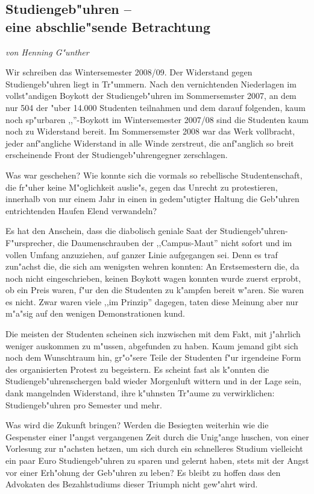\subsection[Studiengeb"uhren]{Studiengeb"uhren --\\ eine abschlie"sende
Betrachtung}
\emph{von Henning G"unther}

Wir schreiben das Wintersemester 2008/09.
Der Widerstand gegen Studiengeb"uhren liegt in Tr"ummern.
Nach den vernichtenden Niederlagen im voll\-st"an\-di\-gen Boykott der
Studiengeb"uhren im Sommersemster 2007, an dem nur 504 der "uber 14.000 Studenten teilnahmen und dem darauf folgenden, kaum noch sp"urbaren ,,\unit[5]{\EUR}{}''-Boykott im Wintersemester 2007/08 sind die Studenten kaum noch zu Widerstand bereit. Im Sommersemster 2008 war das Werk vollbracht, jeder anf"angliche Widerstand in alle Winde zerstreut, die anf"anglich so breit erscheinende Front der Studiengeb"uhrengegner zerschlagen.

Was war geschehen?
Wie konnte sich die vormals so rebellische Studentenschaft, die fr"uher keine M"oglichkeit auslie"s, gegen das Unrecht zu protestieren, innerhalb von nur einem Jahr in einen in gedem"utigter Haltung die Geb"uhren entrichtenden Haufen Elend verwandeln?

Es hat den Anschein, dass die diabolisch geniale Saat der
Studiengeb"uhren-F"ursprecher, die Daumenschrauben der ,,Campus-Maut'' nicht
sofort und im vollen Umfang anzuziehen, auf ganzer Linie aufgegangen sei. Denn es traf zun"achst die, die sich am wenigsten wehren konnten: An Erstsemestern die, da noch nicht eingeschrieben, keinen Boykott wagen
konnten wurde zuerst erprobt, ob \unit[500]{\EUR}{} ein Preis waren, f"ur den die Studenten zu k"ampfen bereit w"aren. Sie waren es nicht.
Zwar waren viele ,,im Prinzip'' dagegen, taten diese Meinung aber nur m"a"sig
auf den wenigen Demonstrationen kund.

Die meisten der Studenten scheinen sich inzwischen mit dem Fakt, mit j"ahrlich
\unit[1000]{\EUR}{} weniger auskommen zu m"ussen, abgefunden zu haben. Kaum jemand gibt sich noch dem Wunschtraum hin, gr"o"sere Teile der Studenten f"ur irgendeine Form des organisierten Protest zu begeistern.
Es scheint fast als k"onnten die Studiengeb"uhrenschergen bald wieder Morgenluft wittern und in der Lage sein, dank mangelnden Widerstand, ihre k"uhnsten Tr"aume zu verwirklichen: \unit[1000]{\EUR}{} Studiengeb"uhren pro Semester und mehr.

Was wird die Zukunft bringen?
Werden die Besiegten weiterhin wie die Gespenster einer l"angst vergangenen Zeit durch die Unig"ange huschen, von einer Vorlesung zur n"achsten hetzen, um sich durch ein schnelleres Studium vielleicht ein paar Euro Studiengeb"uhren zu sparen und gelernt haben, stets mit der Angst vor einer Erh"ohung der Geb"uhren zu leben?
Es bleibt zu hoffen dass den Advokaten des Bezahlstudiums dieser Triumph nicht gew"ahrt wird.
